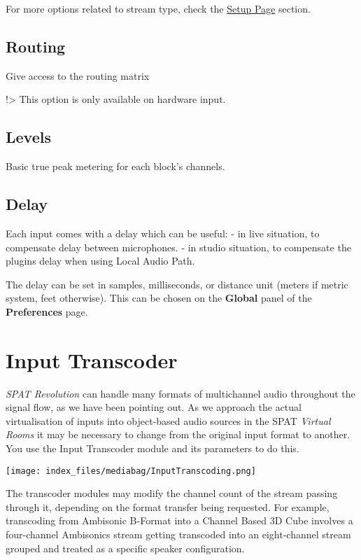 \documentclass[
  letterpaper,
  DIV=11,
  numbers=noendperiod]{scrreport}
\begin{document}
For more options related to stream type, check the
\href{Spat_Environment_Setup_Page.md}{Setup Page} section.

\hypertarget{routing}{%
\section{Routing}\label{routing}}

Give access to the routing matrix

!\textgreater{} This option is only available on hardware input.

\hypertarget{levels}{%
\section{Levels}\label{levels}}

Basic true peak metering for each block's channels.

\hypertarget{delay}{%
\section{Delay}\label{delay}}

Each input comes with a delay which can be useful: - in live situation,
to compensate delay between microphones. - in studio situation, to
compensate the plugins delay when using Local Audio Path.

The delay can be set in samples, milliseconds, or distance unit (meters
if metric system, feet otherwise). This can be chosen on the
\textbf{Global} panel of the \textbf{Preferences} page.

\hypertarget{input-transcoder}{%
\chapter{Input Transcoder}\label{input-transcoder}}

\emph{SPAT Revolution} can handle many formats of multichannel audio
throughout the signal flow, as we have been pointing out. As we approach
the actual virtualisation of inputs into object-based audio sources in
the SPAT \emph{Virtual Rooms} it may be necessary to change from the
original input format to another. You use the Input Transcoder module
and its parameters to do this.

\texttt{[image: index\_files/mediabag/InputTranscoding.png]}

The transcoder modules may modify the channel count of the stream
passing through it, depending on the format transfer being requested.
For example, transcoding from Ambisonic B-Format into a Channel Based 3D
Cube involves a four-channel Ambisonics stream getting transcoded into
an eight-channel stream grouped and treated as a specific speaker
configuration.
\end{document}
